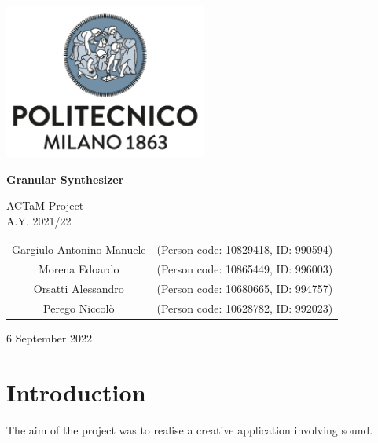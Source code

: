 \documentclass[12pt, a4paper]{article}
\begin{document}
\begin{titlepage}
    \begin{center}
        \includegraphics[width=0.5\textwidth]{logo.png}

        \vspace*{3cm}

        \Huge
        \textbf{Granular Synthesizer}
            
        \vspace{1cm}
        \huge
        ACTaM Project\\
        \Large
        A.Y. 2021/22
            
        \vspace{1.5cm}
        
        {
        \large
        \begin{tabular}{c c}
            Gargiulo Antonino Manuele & (Person code: 10829418, ID: 990594) \\
            Morena Edoardo            & (Person code: 10865449, ID: 996003) \\
            Orsatti Alessandro        & (Person code: 10680665, ID: 994757) \\
            Perego Niccolò            & (Person code: 10628782, ID: 992023)
        \end{tabular}
        }
        
            
        \vfill
        
        6 September 2022
            
        \vspace{1cm}
        
    
            
    \end{center}
\end{titlepage}


\section{Introduction}
The aim of the project was to realise a creative application involving sound. 
\end{document}
